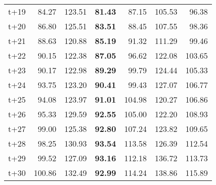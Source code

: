 \begin{table}[H]
\begin{tabular}{lrrrrrr}
t+19  & 84.27  & 123.51  & \textbf{81.43}  & 87.15  & 105.53  & 96.38  \\
t+20  & 86.80  & 125.51  & \textbf{83.51}  & 88.45  & 107.55  & 98.36  \\
t+21  & 88.63  & 120.88  & \textbf{85.19}  & 91.32  & 111.29  & 99.46  \\
t+22  & 90.15  & 122.38  & \textbf{87.05}  & 96.62  & 122.08  & 103.65  \\
t+23  & 90.17  & 122.98  & \textbf{89.29}  & 99.79  & 124.44  & 105.33  \\
t+24  & 93.75  & 123.20  & \textbf{90.41}  & 99.43  & 127.07  & 106.77  \\
t+25  & 94.08  & 123.97  & \textbf{91.01}  & 104.98  & 120.27  & 106.86  \\
t+26  & 95.33  & 129.59  & \textbf{92.55}  & 105.00  & 122.20  & 108.93  \\
t+27  & 99.00  & 125.38  & \textbf{92.80}  & 107.24  & 123.82  & 109.65  \\
t+28  & 98.25  & 130.93  & \textbf{93.54}  & 113.58  & 126.39  & 112.54  \\
t+29  & 99.52  & 127.09  & \textbf{93.16}  & 112.18  & 136.72  & 113.73  \\
t+30  & 100.86  & 132.49  & \textbf{92.99}  & 114.24  & 138.86  & 115.89  \\

\bottomrule
\end{tabular}
\end{table}
